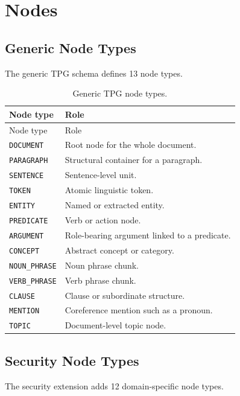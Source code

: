 \documentclass[11pt]{article}
\begin{document}
\section{Nodes}

\subsection{Generic Node Types}

The generic TPG schema defines 13 node types.

\begin{longtable}{lp{}}
\caption{Generic TPG node types.}\\
\toprule
Node type & Role \\
\midrule
\endfirsthead
\toprule
Node type & Role \\
\midrule
\endhead
\bottomrule
\endfoot
\texttt{DOCUMENT} & Root node for the whole document. \\
\texttt{PARAGRAPH} & Structural container for a paragraph. \\
\texttt{SENTENCE} & Sentence-level unit. \\
\texttt{TOKEN} & Atomic linguistic token. \\
\texttt{ENTITY} & Named or extracted entity. \\
\texttt{PREDICATE} & Verb or action node. \\
\texttt{ARGUMENT} & Role-bearing argument linked to a predicate. \\
\texttt{CONCEPT} & Abstract concept or category. \\
\texttt{NOUN\_PHRASE} & Noun phrase chunk. \\
\texttt{VERB\_PHRASE} & Verb phrase chunk. \\
\texttt{CLAUSE} & Clause or subordinate structure. \\
\texttt{MENTION} & Coreference mention such as a pronoun. \\
\texttt{TOPIC} & Document-level topic node. \\
\end{longtable}

\subsection{Security Node Types}

The security extension adds 12 domain-specific node types.
\end{document}
